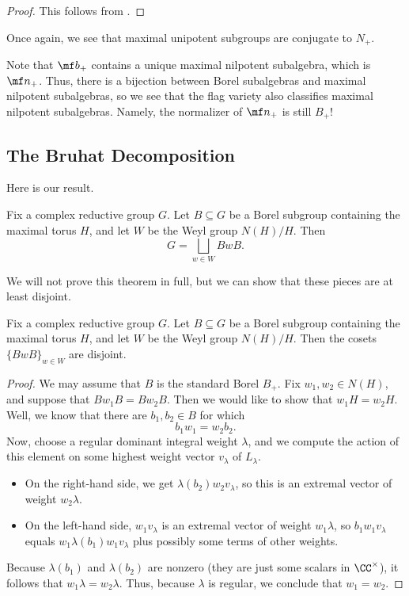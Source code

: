 \documentclass[../notes.tex]{subfiles}
\begin{document}
\begin{proof}
	This follows from .
\end{proof}
\begin{remark}
	Once again, we see that maximal unipotent subgroups are conjugate to $N_+$.
\end{remark}
\begin{remark}
	Note that $\mf b_+$ contains a unique maximal nilpotent subalgebra, which is $\mf n_+$. Thus, there is a bijection between Borel subalgebras and maximal nilpotent subalgebras, so we see that the flag variety also classifies maximal nilpotent subalgebras. Namely, the normalizer of $\mf n_+$ is still $B_+$!
\end{remark}

\subsection{The Bruhat Decomposition}
Here is our result.
\begin{theorem} \label{thm:bruhat}
	Fix a complex reductive group $G$. Let $B\subseteq G$ be a Borel subgroup containing the maximal torus $H$, and let $W$ be the Weyl group $N(H)/H$. Then
	\[G=\bigsqcup_{w\in W}BwB.\]
\end{theorem}
We will not prove this theorem in full, but we can show that these pieces are at least disjoint.
\begin{proposition}
	Fix a complex reductive group $G$. Let $B\subseteq G$ be a Borel subgroup containing the maximal torus $H$, and let $W$ be the Weyl group $N(H)/H$. Then the cosets $\{BwB\}_{w\in W}$ are disjoint.
\end{proposition}
\begin{proof}
	We may assume that $B$ is the standard Borel $B_+$. Fix $w_1,w_2\in N(H)$, and suppose that $Bw_1B=Bw_2B$. Then we would like to show that $w_1H=w_2H$. Well, we know that there are $b_1,b_2\in B$ for which
	\[b_1w_1=w_2b_2.\]
	Now, choose a regular dominant integral weight $\lambda$, and we compute the action of this element on some highest weight vector $v_\lambda$ of $L_\lambda$.
	\begin{itemize}
		\item On the right-hand side, we get $\lambda(b_2)w_2v_\lambda$, so this is an extremal vector of weight $w_2\lambda$.
		\item On the left-hand side, $w_1v_\lambda$ is an extremal vector of weight $w_1\lambda$, so $b_1w_1v_\lambda$ equals $w_1\lambda(b_1)w_1v_\lambda$ plus possibly some terms of other weights.
	\end{itemize}
	Because $\lambda(b_1)$ and $\lambda(b_2)$ are nonzero (they are just some scalars in $\CC^\times$), it follows that $w_1\lambda=w_2\lambda$. Thus, because $\lambda$ is regular, we conclude that $w_1=w_2$.
\end{proof}
\end{document}
